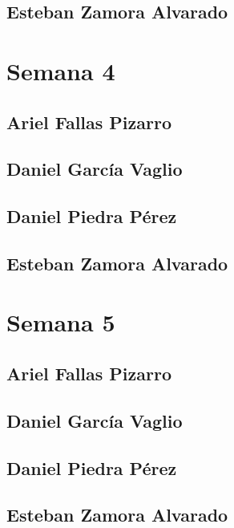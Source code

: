 \subsection{Esteban Zamora Alvarado}

\newpage

\section{Semana 4}
\subsection{Ariel Fallas Pizarro}


\subsection{Daniel García Vaglio}


\subsection{Daniel Piedra Pérez}


\subsection{Esteban Zamora Alvarado}

\newpage

\section{Semana 5}
\subsection{Ariel Fallas Pizarro}


\subsection{Daniel García Vaglio}


\subsection{Daniel Piedra Pérez}


\subsection{Esteban Zamora Alvarado}

\newpage



